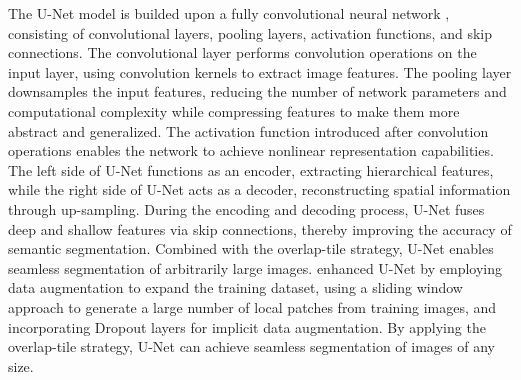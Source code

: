 \documentclass[preprint,12pt,authoryear]{elsarticle}
\begin{document}
The U-Net model \citep{ronneberger_u-net_2015} is builded upon a fully convolutional neural network \citep{shelhamer_fully_2017}, consisting of convolutional layers, pooling layers, activation functions, and skip connections. The convolutional layer performs convolution operations on the input layer, using convolution kernels to extract image features. The pooling layer downsamples the input features, reducing the number of network parameters and computational complexity while compressing features to make them more abstract and generalized. The activation function introduced after convolution operations enables the network to achieve nonlinear representation capabilities. The left side of U-Net functions as an encoder, extracting hierarchical features, while the right side of U-Net acts as a decoder, reconstructing spatial information through up-sampling. During the encoding and decoding process, U-Net fuses deep and shallow features via skip connections, thereby improving the accuracy of semantic segmentation. Combined with the overlap-tile strategy, U-Net enables seamless segmentation of arbitrarily large images. \citet{ronneberger_u-net_2015} enhanced U-Net by employing data augmentation to expand the training dataset, using a sliding window approach to generate a large number of local patches from training images, and incorporating Dropout layers for implicit data augmentation. By applying the overlap-tile strategy, U-Net can achieve seamless segmentation of images of any size. 
\end{document}
